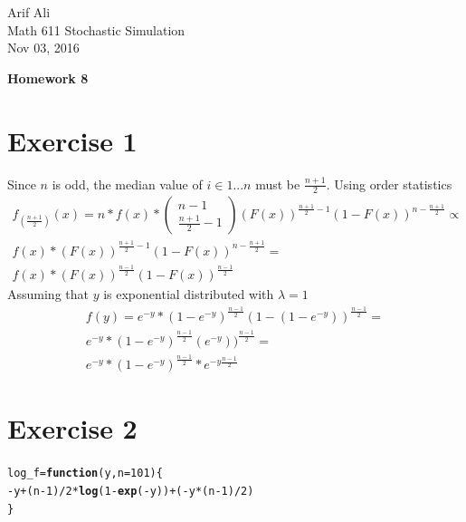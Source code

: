 \documentclass{article}\usepackage[]{graphicx}\usepackage[]{color}
\makeatletter
\newcommand{\hlnum}[1]{\textcolor[rgb]{0.686,0.059,0.569}{#1}}%
\newcommand{\hlopt}[1]{\textcolor[rgb]{0,0,0}{#1}}%
\newcommand{\hlstd}[1]{\textcolor[rgb]{0.345,0.345,0.345}{#1}}%
\newcommand{\hlkwa}[1]{\textcolor[rgb]{0.161,0.373,0.58}{\textbf{#1}}}%
\newcommand{\hlkwb}[1]{\textcolor[rgb]{0.69,0.353,0.396}{#1}}%
\newcommand{\hlkwc}[1]{\textcolor[rgb]{0.333,0.667,0.333}{#1}}%
\newcommand{\hlkwd}[1]{\textcolor[rgb]{0.737,0.353,0.396}{\textbf{#1}}}%
\newenvironment{kframe}{%
 \def\at@end@of@kframe{}%
 \ifinner\ifhmode%
  \def\at@end@of@kframe{\end{minipage}}%
  \begin{minipage}{\columnwidth}%
 \fi\fi%
 \def\FrameCommand##1{\hskip\@totalleftmargin \hskip-\fboxsep
 \colorbox{shadecolor}{##1}\hskip-\fboxsep
     \hskip-\linewidth \hskip-\@totalleftmargin \hskip\columnwidth}%
 \MakeFramed {\advance\hsize-\width
   \@totalleftmargin\z@ \linewidth\hsize
   \@setminipage}}%
 {\par\unskip\endMakeFramed%
 \at@end@of@kframe}
\newenvironment{knitrout}{}{} %
\makeatother
\begin{document}
\begin{flushright}
Arif Ali\\
Math 611 Stochastic Simulation\\
Nov 03, 2016\\
\end{flushright}

\begin{center}
\LARGE\textbf{Homework 8}
  \end{center}
\section*{Exercise 1}

Since $n$ is odd, the median value of $i \in 1...n$ must be $\frac{n+1}{2}$. Using order statistics
\begin{equation}
\begin{split}
f_{(\frac{n+1}{2})}(x) =n*f(x)*\left(\begin{array}{c}
n-1\\
\frac{n+1}{2}-1
\end{array}\right)(F(x))^{\frac{n+1}{2}-1}(1-F(x))^{n-\frac{n+1}{2}} \propto \\
f(x)*(F(x))^{\frac{n+1}{2}-1}(1-F(x))^{n-\frac{n+1}{2}} = \\
f(x)*(F(x))^{\frac{n-1}{2}}(1-F(x))^{\frac{n-1}{2}}
\end{split}
\end{equation}
Assuming that $y$ is exponential distributed with $\lambda = 1$
\begin{equation}
\begin{split}
f(y) = e^{-y}*(1-e^{-y})^{\frac{n-1}{2}}(1-(1-e^{-y}))^{\frac{n-1}{2}} = \\
e^{-y}*(1-e^{-y})^{\frac{n-1}{2}}(e^{-y}))^{\frac{n-1}{2}} = \\
e^{-y}*(1-e^{-y})^{\frac{n-1}{2}}*e^{-y\frac{n-1}{2}}
\end{split}
\end{equation}
\section*{Exercise 2}
\begin{knitrout}
\color{fgcolor}\begin{kframe}
\begin{alltt}
\hlstd{log_f} \hlkwb{=} \hlkwa{function}\hlstd{(}\hlkwc{y}\hlstd{,}\hlkwc{n}\hlstd{=}\hlnum{101}\hlstd{)\{}
  \hlopt{-}\hlstd{y}\hlopt{+}\hlstd{(n}\hlopt{-}\hlnum{1}\hlstd{)}\hlopt{/}\hlnum{2}\hlopt{*}\hlkwd{log}\hlstd{(}\hlnum{1}\hlopt{-}\hlkwd{exp}\hlstd{(}\hlopt{-}\hlstd{y))}\hlopt{+}\hlstd{(}\hlopt{-}\hlstd{y}\hlopt{*}\hlstd{(n}\hlopt{-}\hlnum{1}\hlstd{)}\hlopt{/}\hlnum{2}\hlstd{)}
\hlstd{\}}
\end{alltt}
\end{kframe}
\end{knitrout}
\end{document}
